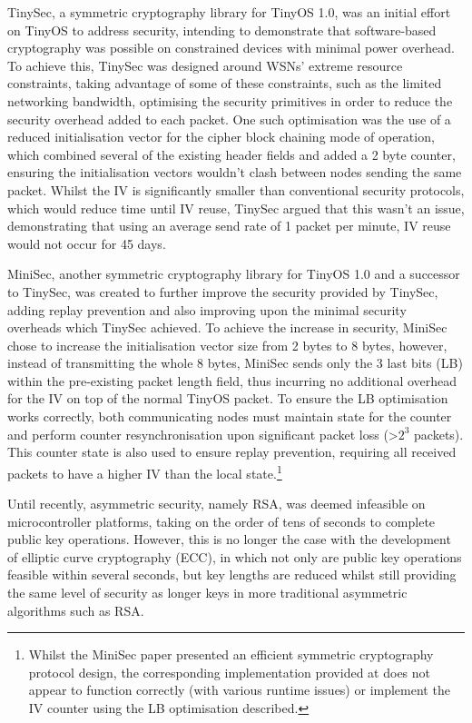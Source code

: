 \documentclass{mpaper}
\begin{document}
TinySec\cite{TinySec}, a symmetric cryptography library for TinyOS 1.0, was an initial effort on TinyOS to address security, intending to demonstrate that software-based cryptography was possible on constrained devices with minimal power overhead. To achieve this, TinySec was designed around WSNs' extreme resource constraints, taking advantage of some of these constraints, such as the limited networking bandwidth, optimising the security primitives in order to reduce the security overhead added to each packet. One such optimisation was the use of a reduced initialisation vector for the cipher block chaining mode of operation, which combined several of the existing header fields and added a 2 byte counter, ensuring the initialisation vectors wouldn't clash between nodes sending the same packet. Whilst the IV is significantly smaller than conventional security protocols, which would reduce time until IV reuse, TinySec argued that this wasn't an issue, demonstrating that using an average send rate of 1 packet per minute, IV reuse would not occur for 45 days.

MiniSec, another symmetric cryptography library for TinyOS 1.0 and a successor to TinySec, was created to further improve the security provided by TinySec, adding replay prevention and also improving upon the minimal security overheads which TinySec achieved. To achieve the increase in security, MiniSec chose to increase the initialisation vector size from 2 bytes to 8 bytes, however, instead of transmitting the whole 8 bytes, MiniSec sends only the 3 last bits (LB) within the pre-existing packet length field, thus incurring no additional overhead for the IV on top of the normal TinyOS packet. To ensure the LB optimisation works correctly, both communicating nodes must maintain state for the counter and perform counter resynchronisation upon significant packet loss (\textgreater$2^3$ packets). This counter state is also used to ensure replay prevention, requiring all received packets to have a higher IV than the local state.\footnote{Whilst the MiniSec paper presented an efficient symmetric cryptography protocol design, the corresponding implementation provided at \cite{MiniSecLink} does not appear to function correctly (with various runtime issues) or implement the IV counter using the LB optimisation described.}

Until recently, asymmetric security, namely RSA, was deemed infeasible on microcontroller platforms, taking on the order of tens of seconds to complete public key operations\cite{TinyECC}. However, this is no longer the case with the development of elliptic curve cryptography (ECC), in which not only are public key operations feasible within several seconds, but key lengths are reduced whilst still providing the same level of security as longer keys in more traditional asymmetric algorithms such as RSA. 
\end{document}
